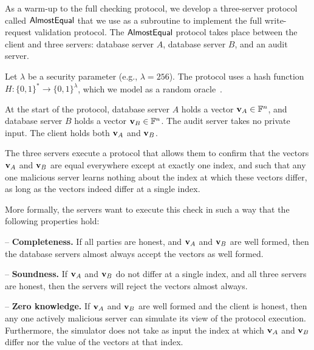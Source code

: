 \documentclass[10pt,twocolumn]{article}
\newcommand{\F}{\mathbb{F}}
\newcommand{\vA}{{\bf v}_A}
\newcommand{\vB}{{\bf v}_B}
\begin{document}
As a warm-up to the full checking protocol, 
we develop a three-server protocol called
${\sf AlmostEqual}$
that we use as a subroutine 
to implement the full write-request validation protocol.
The ${\sf AlmostEqual}$ protocol takes place between 
the client and three servers: 
database server $A$, database server $B$, and an audit server.

Let $\lambda$ be a security parameter (e.g., $\lambda = 256$).  
The protocol uses a hash function 
$H: \{0,1\}^* \to \{0,1\}^{\lambda}$, which we model as a random
oracle~\cite{bellare1993random}.

At the start of the protocol, database server $A$ holds 
a vector ${\vA \in \F^n}$, and database server $B$ holds a vector
${\vB \in \F^n}$.
The audit server takes no private input.
The client holds both $\vA$ and $\vB$.

The three servers execute a protocol that allows them to confirm
that the vectors $\vA$ and $\vB$ are equal everywhere except at exactly one index, and
such that any one malicious server learns nothing about 
the index at which these vectors differ,
as long as the vectors indeed differ at a single index.

More formally, the servers want to execute this 
check in such a way that the following properties hold:
\begin{compactitem}
\item[--] \textbf{Completeness.} If all parties are honest, and
    $\vA$ and $\vB$ are well formed, then the database servers 
    almost always accept the vectors as well formed.
\item[--] \textbf{Soundness.} If $\vA$ and $\vB$ do not differ
    at a single index, and all three servers are honest, then the
    servers will reject the vectors almost always.
\item[--] \textbf{Zero knowledge.} If $\vA$ and $\vB$ are well formed
    and the client is honest, then any one actively malicious server
    can simulate its view of the protocol execution. Furthermore,
    the simulator does not take as input the index at which $\vA$ and $\vB$
    differ nor the value of the vectors at that index.
\end{compactitem}
\end{document}
